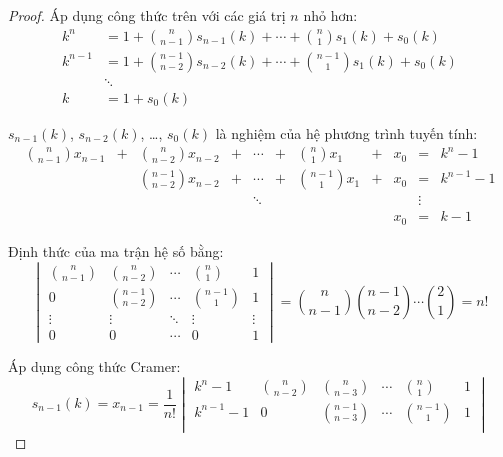 \documentclass[class=nhvh-linear-algebra,crop=false]{standalone}
\begin{document}
\begin{proof}
	\par Áp dụng công thức trên với các giá trị $n$ nhỏ hơn:
	\begin{align*}
		k^{n}   & = 1 + \binom{n}{n-1}s_{n-1}(k) + \cdots + \binom{n}{1}s_{1}(k) + s_{0}(k)     \\
		k^{n-1} & = 1 + \binom{n-1}{n-2}s_{n-2}(k) + \cdots + \binom{n-1}{1}s_{1}(k) + s_{0}(k) \\
		        & \ddots                                                                        \\
		k       & = 1 + s_{0}(k)
	\end{align*}
	\par $s_{n-1}(k)$, $s_{n-2}(k)$, \ldots, $s_{0}(k)$ là nghiệm của hệ phương trình tuyến tính:
	\[
		\begin{array}{ccccccccccc}
			\binom{n}{n-1}x_{n-1} & + & \binom{n}{n-2}x_{n-2}   & + & \cdots & + & \binom{n}{1}x_{1}   & + & x_{0} & =      & k^{n} - 1   \\
			                      &   & \binom{n-1}{n-2}x_{n-2} & + & \cdots & + & \binom{n-1}{1}x_{1} & + & x_{0} & =      & k^{n-1} - 1 \\
			                      &   &                         &   & \ddots &   &                     &   &       & \vdots &             \\
			                      &   &                         &   &        &   &                     &   & x_{0} & =      & k - 1
		\end{array}
	\]
	\par Định thức của ma trận hệ số bằng:
	\[
		\begin{vmatrix}
			\binom{n}{n-1} & \binom{n}{n-2}   & \cdots & \binom{n}{1}   & 1      \\
			0              & \binom{n-1}{n-2} & \cdots & \binom{n-1}{1} & 1      \\
			\vdots         & \vdots           & \ddots & \vdots         & \vdots \\
			0              & 0                & \cdots & 0              & 1
		\end{vmatrix}
		= \binom{n}{n-1}\binom{n-1}{n-2}\cdots\binom{2}{1}
		= n!
	\]
	\par Áp dụng công thức Cramer:
	\[
		s_{n-1}(k) = x_{n-1} = \dfrac{1}{n!}
		\begin{vmatrix}
			k^{n} - 1   & \binom{n}{n-2} & \binom{n}{n-3}   & \cdots & \binom{n}{1}   & 1      \\
			k^{n-1} - 1 & 0              & \binom{n-1}{n-3} & \cdots & \binom{n-1}{1} & 1      \\

\end{vmatrix}\]
\end{proof}
\end{document}

